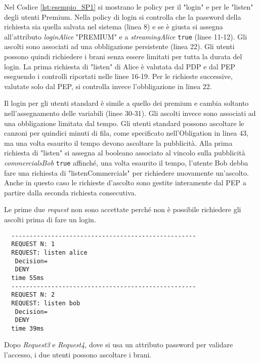 Nel Codice \ref{lst:esempio_SP1} si mostrano le policy per il "login" e per le "listen" degli utenti Premium.
Nella policy di login si controlla che la password della richiesta sia quella salvata nel sistema (linea 8) e se è giusta
si assegna all'attributo \emph{loginAlice} "PREMIUM" e a \emph{streamingAlice} \texttt{true} (linee 11-12).
Gli ascolti sono associati ad una obbligazione persistente (linea 22).
Gli utenti possono quindi richiedere i brani senza essere limitati per tutta la durata del login.
La prima richiesta di "listen" di Alice è valutata dal \ac{PDP} e dal \ac{PEP} eseguendo i controlli riportati
nelle linee 16-19. Per le richieste successive, valutate solo dal \ac{PEP}, si controlla invece l'obbligazione in linea 22.

Il login per gli utenti standard è simile a quello dei premium e cambia soltanto nell'assegnamento delle variabili (linee 30-31).
Gli ascolti invece sono associati ad una obbligazione limitata dal tempo. Gli utenti standard possono ascoltare
le canzoni per quindici minuti di fila, come specificato nell'Obligation in linea 43, ma una volta esaurito il tempo
devono ascoltare la pubblicità. Alla prima richiesta di "listen" si assegna al booleano associato al vincolo sulla
pubblicità \emph{commercialsBob} \texttt{true} affinché, una volta esaurito il tempo, l'utente Bob debba fare una richiesta
di "listenCommercials" per richiedere nuovamente un'ascolto.
Anche in questo caso le richieste d'ascolto sono gestite interamente dal \ac{PEP} a partire dalla
seconda richiesta consecutiva.

Le prime due \emph{request} non sono accettate perché non è possibile richiedere gli ascolti prima di fare un login.

\begin{verbatim}
  ---------------------------------------------------
  REQUEST N: 1
  REQUEST: listen alice
   Decision=
   DENY
  time 55ms
  ---------------------------------------------------
  REQUEST N: 2
  REQUEST: listen bob
   Decision=
   DENY
  time 39ms
\end{verbatim}
Dopo \emph{Request3} e \emph{Request4}, dove si usa un attributo password per validare l'accesso, i due utenti possono ascoltare i brani.
